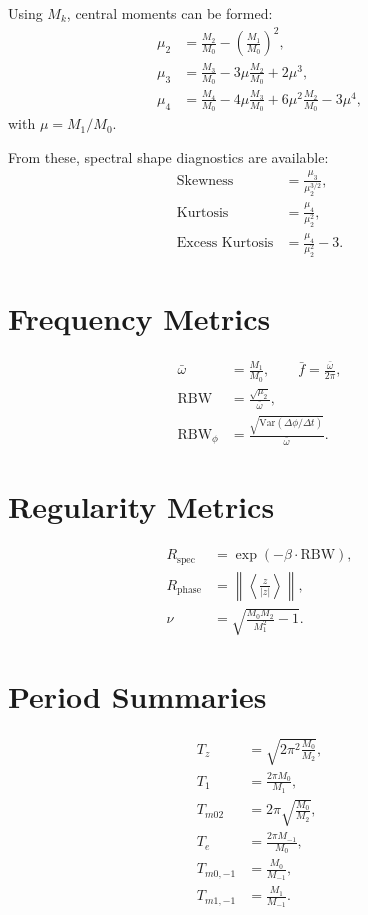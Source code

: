 \documentclass[11pt]{article}
\begin{document}
Using $M_k$, central moments can be formed:
\begin{align}
\mu_2 &= \tfrac{M_2}{M_0} - \left(\tfrac{M_1}{M_0}\right)^2, \\
\mu_3 &= \tfrac{M_3}{M_0} - 3\mu \tfrac{M_2}{M_0} + 2\mu^3, \\
\mu_4 &= \tfrac{M_4}{M_0} - 4\mu \tfrac{M_3}{M_0} + 6\mu^2 \tfrac{M_2}{M_0} - 3\mu^4,
\end{align}
with $\mu = M_1/M_0$.

From these, spectral shape diagnostics are available:
\begin{align}
\text{Skewness} &= \frac{\mu_3}{\mu_2^{3/2}}, \\
\text{Kurtosis} &= \frac{\mu_4}{\mu_2^2}, \\
\text{Excess Kurtosis} &= \frac{\mu_4}{\mu_2^2} - 3.
\end{align}

\section{Frequency Metrics}

\begin{align}
\bar{\omega} &= \frac{M_1}{M_0}, 
\qquad \bar{f} = \frac{\bar{\omega}}{2\pi}, \\
\text{RBW} &= \frac{\sqrt{\mu_2}}{\bar{\omega}}, \\
\text{RBW}_{\phi} &= \frac{\sqrt{\mathrm{Var}(\Delta \phi / \Delta t)}}{\bar{\omega}}.
\end{align}

\section{Regularity Metrics}

\begin{align}
R_{\text{spec}} &= \exp(-\beta \cdot \text{RBW}), \\
R_{\text{phase}} &= \left\|\left\langle \frac{z}{|z|} \right\rangle\right\|, \\
\nu &= \sqrt{\frac{M_0 M_2}{M_1^2} - 1}.
\end{align}

\section{Period Summaries}

\begin{align}
T_z &= \sqrt{2\pi^2 \frac{M_0}{M_2}}, \\
T_1 &= \frac{2\pi M_0}{M_1}, \\
T_{m02} &= 2\pi \sqrt{\frac{M_0}{M_2}}, \\
T_e &= \frac{2\pi M_{-1}}{M_0}, \\
T_{m0,-1} &= \frac{M_0}{M_{-1}}, \\
T_{m1,-1} &= \frac{M_1}{M_{-1}}.
\end{align}
\end{document}
